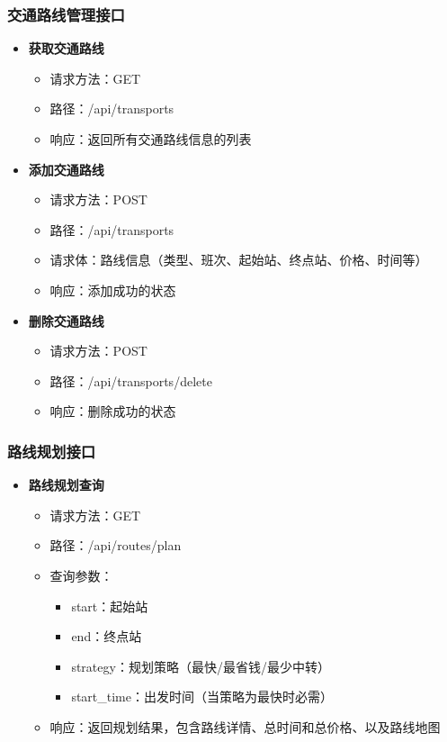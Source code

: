 \documentclass[10pt]{article}
\begin{document}
    \subsubsection{交通路线管理接口}
    \begin{itemize}
        \item \textbf{获取交通路线}
        \begin{itemize}
            \item 请求方法：GET
            \item 路径：/api/transports
            \item 响应：返回所有交通路线信息的列表
        \end{itemize}
        \item \textbf{添加交通路线}
        \begin{itemize}
            \item 请求方法：POST
            \item 路径：/api/transports
            \item 请求体：路线信息（类型、班次、起始站、终点站、价格、时间等）
            \item 响应：添加成功的状态
        \end{itemize}
        \item \textbf{删除交通路线}
        \begin{itemize}
            \item 请求方法：POST
            \item 路径：/api/transports/delete
            \item 响应：删除成功的状态
        \end{itemize}
    \end{itemize}

    \subsubsection{路线规划接口}
    \begin{itemize}
        \item \textbf{路线规划查询}
        \begin{itemize}
            \item 请求方法：GET
            \item 路径：/api/routes/plan
            \item 查询参数：
            \begin{itemize}
                \item start：起始站
                \item end：终点站
                \item strategy：规划策略（最快/最省钱/最少中转）
                \item start\_time：出发时间（当策略为最快时必需）
            \end{itemize}
            \item 响应：返回规划结果，包含路线详情、总时间和总价格、以及路线地图
        \end{itemize}
    \end{itemize}
\end{document}
